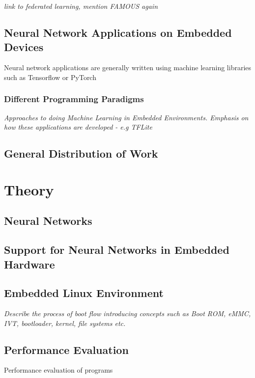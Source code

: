 \textit{link to federated learning, mention FAMOUS again}

\section{Neural Network Applications on Embedded Devices}

Neural network applications are generally written using machine learning libraries such as Tensorflow or PyTorch

\subsection{Different Programming Paradigms}
\textit{Approaches to doing Machine Learning in Embedded Environments. Emphasis on how these applications are developed - e.g TFLite}

\section{General Distribution of Work}

\chapter{Theory}

\section{Neural Networks}

\section{Support for Neural Networks in Embedded Hardware}

\section{Embedded Linux Environment}
\textit{Describe the process of boot flow introducing concepts such as Boot ROM, eMMC, IVT, bootloader, kernel, file systems etc.}

\section{Performance Evaluation}

Performance evaluation of programs
